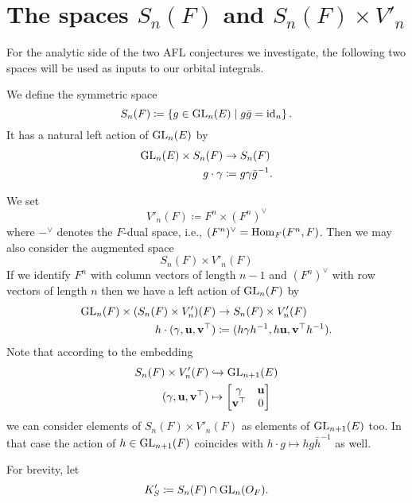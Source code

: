 \section{The spaces $S_n(F)$ and $S_n(F) \times V'_n$}
For the analytic side of the two AFL conjectures we investigate,
the following two spaces will be used as inputs to our orbital integrals.
\begin{definition}
  We define the symmetric space
  \[ S_n(F) \coloneqq \left\{ g \in \operatorname{GL}_n(E) \mid g \bar g = \operatorname{id}_n \right\}. \]
  It has a natural left action of $\operatorname{GL}_n(E)$ by
  \begin{align*}
    \operatorname{GL}_n(E) \times S_n(F) &\to S_n(F) \\
    g \cdot \gamma &\coloneqq g \gamma \bar g^{-1}.
  \end{align*}
\end{definition}

\begin{definition}
  We set
  \[ V'_n(F) \coloneqq F^n \times (F^n)^\vee \]
  where $-^\vee$ denotes the $F$-dual space, i.e., $(F^n)^\vee = \operatorname{Hom}_F(F^n, F)$.
  Then we may also consider the augmented space
  \[ S_n(F) \times V'_n(F) \]
  If we identify $F^n$ with column vectors of length $n-1$ and $(F^n)^\vee$
  with row vectors of length $n$ then we have a left action of $\operatorname{GL}_n(F)$ by
  \begin{align*}
    \operatorname{GL}_n(F) \times (S_n(F) \times V'_n)(F)
    &\to S_n(F) \times V'_n(F) \\
    h \cdot (\gamma, \mathbf u, \mathbf v^\top)
    &\coloneqq (h \gamma h^{-1}, h\mathbf u, \mathbf v^\top h^{-1}).
  \end{align*}
  Note that according to the embedding
  \begin{align*}
    S_n(F) \times V'_n(F)
    &\hookrightarrow \operatorname{GL}_{n+1}(E) \\
    (\gamma, \mathbf u, \mathbf v^\top)
    &\mapsto \begin{bmatrix} \gamma & \mathbf u \\ \mathbf v^\top & 0 \end{bmatrix}
  \end{align*}
  we can consider elements of $S_n(F) \times V'_n(F)$ as elements of $\operatorname{GL}_{n+1}(E)$ too.
  In that case the action of $h \in \operatorname{GL}_{n+1}(F)$
  coincides with $h \cdot g \mapsto hg\bar{h}^{-1}$ as well.
\end{definition}

\begin{definition}
  For brevity, let
   \[ K'_S \coloneqq S_n(F) \cap \operatorname{GL}_n(O_F). \]
\end{definition}

